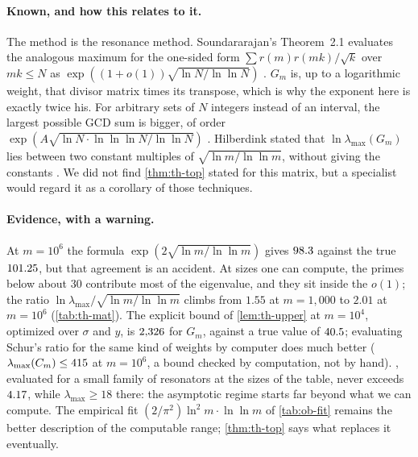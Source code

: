 \paragraph{Known, and how this relates to it.} The method is the resonance method. Soundararajan's Theorem~2.1 evaluates the analogous maximum for the one-sided form $\sum r(m)r(mk)/\sqrt k$ over $mk \le N$ as $\exp((1 + o(1))\sqrt{\ln N/\ln\ln N})$ \citep{Soundararajan2008}. $G_m$ is, up to a logarithmic weight, that divisor matrix times its transpose, which is why the exponent here is exactly twice his. For arbitrary sets of $N$ integers instead of an interval, the largest possible GCD sum is bigger, of order $\exp(A\sqrt{\ln N\cdot\ln\ln\ln N/\ln\ln N})$ \citep{AistleitnerBerkesSeip2015,BondarenkoSeip2015,BondarenkoSeip2017}. Hilberdink stated that $\ln\lambda_{\max}(G_m)$ lies between two constant multiples of $\sqrt{\ln m/\ln\ln m}$, without giving the constants \citep{Hilberdink2009}. We did not find \cref{thm:th-top} stated for this matrix, but a specialist would regard it as a corollary of those techniques.

\paragraph{Evidence, with a warning.} At $m = 10^6$ the formula $\exp(2\sqrt{\ln m/\ln\ln m})$ gives $98.3$ against the true $101.25$, but that agreement is an accident. At sizes one can compute, the primes below about 30 contribute most of the eigenvalue, and they sit inside the $o(1)$; the ratio $\ln\lambda_{\max}/\sqrt{\ln m/\ln\ln m}$ climbs from $1.55$ at $m = 1{,}000$ to $2.01$ at $m = 10^6$ (\cref{tab:th-mat}). The explicit bound of \cref{lem:th-upper} at $m = 10^4$, optimized over $\sigma$ and $y$, is $2{,}326$ for $G_m$, against a true value of $40.5$; evaluating Schur's ratio for the same kind of weights by computer does much better ($\lambda_{\max}(C_m) \le 415$ at $m = 10^6$, a bound checked by computation, not by hand). , evaluated for a small family of resonators at the sizes of the table, never exceeds $4.17$, while $\lambda_{\max} \ge 18$ there: the asymptotic regime starts far beyond what we can compute. The empirical fit $(2/\pi^2)\ln^2m\cdot\ln\ln m$ of \cref{tab:ob-fit} remains the better description of the computable range; \cref{thm:th-top} says what replaces it eventually.

